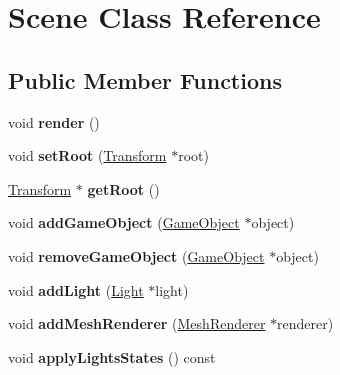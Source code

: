 \hypertarget{class_scene}{
\section{Scene Class Reference}
\label{class_scene}
}
\subsection*{Public Member Functions}
\begin{DoxyCompactItemize}
\item 
\hypertarget{class_scene_a4ddf2d16f371ee9533b3faf1dd5ddfb1}{
void {\bfseries render} ()}
\label{class_scene_a4ddf2d16f371ee9533b3faf1dd5ddfb1}

\item 
\hypertarget{class_scene_a69f2b1c4849bc11d64820473d0346055}{
void {\bfseries setRoot} (\hyperlink{class_transform}{Transform} $\ast$root)}
\label{class_scene_a69f2b1c4849bc11d64820473d0346055}

\item 
\hypertarget{class_scene_a47f1c7d12d5a8579d798e03d7b046a5c}{
\hyperlink{class_transform}{Transform} $\ast$ {\bfseries getRoot} ()}
\label{class_scene_a47f1c7d12d5a8579d798e03d7b046a5c}

\item 
\hypertarget{class_scene_a6320c8939cde42065e446ec96fb773ac}{
void {\bfseries addGameObject} (\hyperlink{class_game_object}{GameObject} $\ast$object)}
\label{class_scene_a6320c8939cde42065e446ec96fb773ac}

\item 
\hypertarget{class_scene_a6c25f42faa6ce62b9aa2ecf97ef92447}{
void {\bfseries removeGameObject} (\hyperlink{class_game_object}{GameObject} $\ast$object)}
\label{class_scene_a6c25f42faa6ce62b9aa2ecf97ef92447}

\item 
\hypertarget{class_scene_a13b298b0c24c92929bf9850012980623}{
void {\bfseries addLight} (\hyperlink{class_light}{Light} $\ast$light)}
\label{class_scene_a13b298b0c24c92929bf9850012980623}

\item 
\hypertarget{class_scene_a41cdd9b48a474cc640ae00a84188e81a}{
void {\bfseries addMeshRenderer} (\hyperlink{class_mesh_renderer}{MeshRenderer} $\ast$renderer)}
\label{class_scene_a41cdd9b48a474cc640ae00a84188e81a}

\item 
\hypertarget{class_scene_a02f79812e48581675c97c67c598fbe9b}{
void {\bfseries applyLightsStates} () const }
\label{class_scene_a02f79812e48581675c97c67c598fbe9b}


\end{DoxyCompactItemize}
